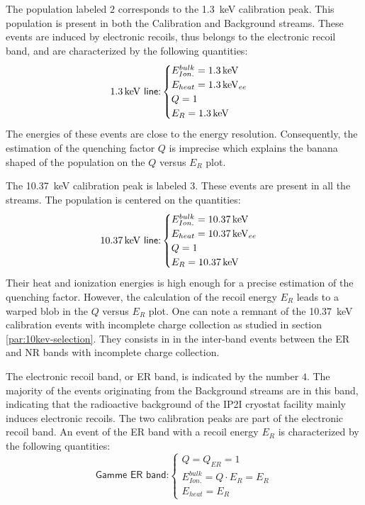 The population labeled $2$ corresponds to the \SI{1.3}{\kilo\eV} calibration peak. This population is present in both the Calibration and Background streams. These events are induced by electronic recoils, thus belongs to the electronic recoil band, and are characterized by the following quantities:
\begin{equation}
\textsf{\SI{1.3}{\kilo\eV} line:}
\begin{cases}
E_{Ion.}^{bulk} = \SI{1.3}{\kilo\eV} \\
E_{heat} = \SI{1.3}{\kilo\eV}_{ee} \\
Q = 1 \\
E_R = \SI{1.3}{\kilo\eV}
\end{cases}
\end{equation}
The energies of these events are close to the energy resolution. Consequently, the estimation of the quenching factor $Q$ is imprecise which explains the banana shaped of the population on the $Q$ versus $E_R$ plot.

The \SI{10.37}{\kilo\eV} calibration peak is labeled $3$. These events are present in all the streams. The population is centered on the quantities:
\begin{equation}
\textsf{\SI{10.37}{\kilo\eV} line:}
\begin{cases}
E_{Ion.}^{bulk} = \SI{10.37}{\kilo\eV} \\
E_{heat} = \SI{10.37}{\kilo\eV}_{ee} \\
Q = 1 \\
E_R = \SI{10.37}{\kilo\eV}
\end{cases}
\end{equation}
Their heat and ionization energies is high enough for a precise estimation of the quenching factor. However, the calculation of the recoil energy $E_R$ leads to a warped blob in the $Q$ versus $E_R$ plot. 
One can note a remnant of the \SI{10.37}{\kilo\eV} calibration events with incomplete charge collection as studied in section \ref{par:10kev-selection}. They consists in in the inter-band events between the ER and NR bands with incomplete charge collection.

The electronic recoil band, or ER band, is indicated by the number $4$. The majority of the events originating from the Background streams are in this band, indicating that the radioactive background of the IP2I cryostat facility mainly induces electronic recoils. The two calibration peaks are part of the electronic recoil band. An event of the ER band with a recoil energy $E_R$ is characterized by the following quantities:
\begin{equation}
\label{eq:er-band}
\textsf{Gamme ER band:}
\begin{cases}
Q = Q_{ER} = 1 \\
E_{Ion.}^{bulk} = Q \cdot E_R = E_R \\
E_{heat} = E_R
\end{cases}
\end{equation}

